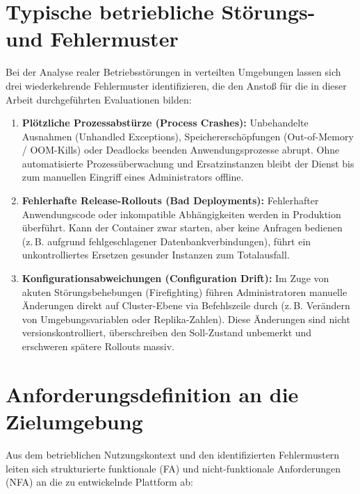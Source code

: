 \section{Typische betriebliche Störungs- und Fehlermuster}
\label{sec:stoerungsmuster}
Bei der Analyse realer Betriebsstörungen in verteilten Umgebungen lassen sich drei wiederkehrende Fehlermuster identifizieren, die den Anstoß für die in dieser Arbeit durchgeführten Evaluationen bilden:
\begin{enumerate}
    \item \textbf{Plötzliche Prozessabstürze (Process Crashes):} Unbehandelte Ausnahmen (Unhandled Exceptions), Speichererschöpfungen (Out-of-Memory / OOM-Kills) oder Deadlocks beenden Anwendungsprozesse abrupt. Ohne automatisierte Prozessüberwachung und Ersatzinstanzen bleibt der Dienst bis zum manuellen Eingriff eines Administrators offline.
    \item \textbf{Fehlerhafte Release-Rollouts (Bad Deployments):} Fehlerhafter Anwendungscode oder inkompatible Abhängigkeiten werden in Produktion überführt. Kann der Container zwar starten, aber keine Anfragen bedienen (z.\,B. aufgrund fehlgeschlagener Datenbankverbindungen), führt ein unkontrolliertes Ersetzen gesunder Instanzen zum Totalausfall.
    \item \textbf{Konfigurationsabweichungen (Configuration Drift):} Im Zuge von akuten Störungsbehebungen (Firefighting) führen Administratoren manuelle Änderungen direkt auf Cluster-Ebene via Befehlszeile durch (z.\,B. Verändern von Umgebungsvariablen oder Replika-Zahlen). Diese Änderungen sind nicht versionskontrolliert, überschreiben den Soll-Zustand unbemerkt und erschweren spätere Rollouts massiv.
\end{enumerate}

\section{Anforderungsdefinition an die Zielumgebung}
\label{sec:anforderungen-betriebsumgebung}
Aus dem betrieblichen Nutzungskontext und den identifizierten Fehlermustern leiten sich strukturierte funktionale (FA) und nicht-funktionale Anforderungen (NFA) an die zu entwickelnde Plattform ab:

